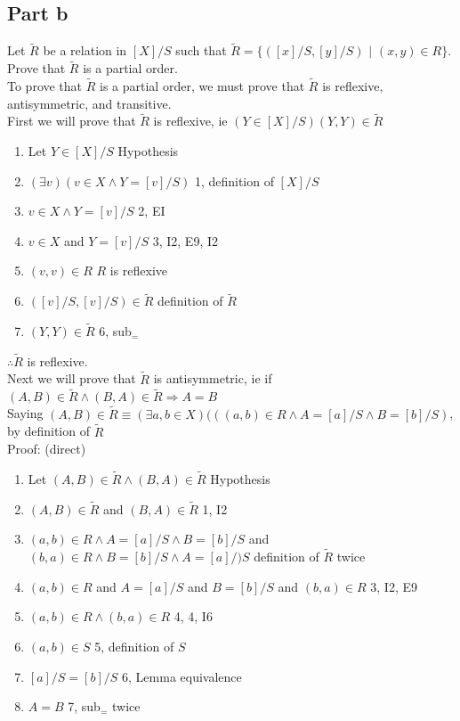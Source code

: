 \documentclass{article}
\begin{document}
		\subsection{Part b}
			Let $\widetilde{R}$ be a relation in $[X]/S$ such that $\widetilde{R} = \{([x]/S, [y]/S)$ $|$ $(x, y) \in R\}$. Prove that $\widetilde{R}$ is a partial order. \\
			To prove that $\widetilde{R}$ is a partial order, we must prove that $\widetilde{R}$ is reflexive, antisymmetric, and transitive. \\
			First we will prove that $\widetilde{R}$ is reflexive, ie $(Y \in [X]/S)(Y, Y) \in \widetilde{R}$
			\begin{enumerate}
				\item Let $Y \in [X]/S$ \hfill Hypothesis
				\item $(\exists v)(v \in X \land Y = [v]/S)$ \hfill 1, definition of $[X]/S$
				\item $v \in X \land Y = [v]/S$ \hfill 2, EI
				\item $v \in X$ and $Y = [v]/S$ \hfill 3, I2, E9, I2
				\item $(v, v) \in R$ \hfill $R$ is reflexive
				\item $([v]/S, [v]/S) \in \widetilde{R}$ \hfill definition of $\widetilde{R}$
				\item $(Y, Y) \in \widetilde{R}$ \hfill 6, sub$_{=}$
			\end{enumerate}
			$\therefore \widetilde{R}$ is reflexive. \\
			Next we will prove that $\widetilde{R}$ is antisymmetric, ie if $(A, B) \in \widetilde{R} \land (B, A) \in \widetilde{R} \Rightarrow A = B$ \\
			Saying $(A, B) \in \widetilde{R} \equiv (\exists a, b \in X)(((a, b) \in R \land A = [a]/S \land B = [b]/S)$, by definition of $\widetilde{R}$ \\
			Proof: (direct) \\
			\begin{enumerate}
				\item Let $(A, B) \in \widetilde{R} \land (B, A) \in \widetilde{R}$ \hfill Hypothesis
				\item $(A, B) \in \widetilde{R}$ and $(B, A) \in \widetilde{R}$ \hfill 1, I2
				\item $(a, b) \in R \land A = [a]/S \land B = [b]/S$ and $(b, a) \in R \land B = [b]/S \land A = [a]/)S$ \hfill definition of $\widetilde{R}$ twice
				\item $(a, b) \in R$ and $A = [a]/S$ and $B = [b]/S$ and $(b, a) \in R$ \hfill 3, I2, E9
				\item $(a, b) \in R \land (b, a) \in R$ \hfill 4, 4, I6
				\item $(a, b) \in S$ \hfill 5, definition of $S$
				\item $[a]/S = [b]/S$ \hfill 6, Lemma equivalence
				\item $A = B$ \hfill 7, sub$_{=}$ twice
			\end{enumerate}
\end{document}
